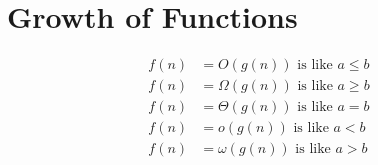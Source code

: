 \section{Growth of Functions}\label{sec:GrowthOfFunctions}

\begin{equation} \label{eq1}
    \begin{split}
        f(n) & = O(g(n))   \text{     is like     }  a\leq b   \\
        f(n) & = \Omega(g(n)) \text{     is like     }   a\geq b   \\
        f(n) & = \Theta(g(n))  \text{     is like     }  a= b   \\
        f(n) & = o(g(n)) \text{     is like     }  a < b \\
        f(n) & = \omega(g(n)) \text{     is like     }  a>b  
    \end{split}
\end{equation}

\subsection{}